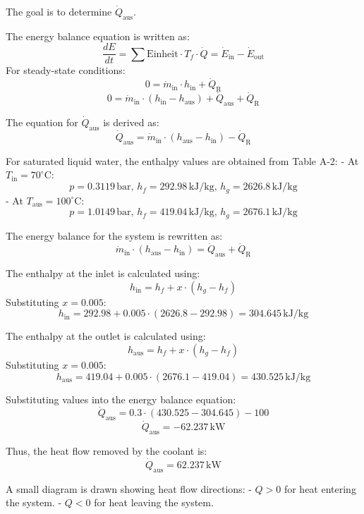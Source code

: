 The goal is to determine \( \dot{Q}_{\text{aus}} \).  

The energy balance equation is written as:  
\[
\frac{dE}{dt} = \sum \text{Einheit} \cdot T_f \cdot \dot{Q} = \dot{E}_{\text{in}} - \dot{E}_{\text{out}}
\]  
For steady-state conditions:  
\[
0 = \dot{m}_{\text{in}} \cdot h_{\text{in}} + \dot{Q}_{\text{R}}
\]  
\[
0 = \dot{m}_{\text{in}} \cdot (h_{\text{in}} - h_{\text{aus}}) + \dot{Q}_{\text{aus}} + \dot{Q}_{\text{R}}
\]  

The equation for \( \dot{Q}_{\text{aus}} \) is derived as:  
\[
\dot{Q}_{\text{aus}} = \dot{m}_{\text{in}} \cdot (h_{\text{aus}} - h_{\text{in}}) - \dot{Q}_{\text{R}}
\]  

For saturated liquid water, the enthalpy values are obtained from Table A-2:  
- At \( T_{\text{in}} = 70^\circ\text{C} \):  
  \[
  p = 0.3119 \, \text{bar}, \, h_f = 292.98 \, \text{kJ/kg}, \, h_g = 2626.8 \, \text{kJ/kg}
  \]  
- At \( T_{\text{aus}} = 100^\circ\text{C} \):  
  \[
  p = 1.0149 \, \text{bar}, \, h_f = 419.04 \, \text{kJ/kg}, \, h_g = 2676.1 \, \text{kJ/kg}
  \]  

The energy balance for the system is rewritten as:  
\[
\dot{m}_{\text{in}} \cdot (h_{\text{aus}} - h_{\text{in}}) = \dot{Q}_{\text{aus}} + \dot{Q}_{\text{R}}
\]  

The enthalpy at the inlet is calculated using:  
\[
h_{\text{in}} = h_f + x \cdot (h_g - h_f)
\]  
Substituting \( x = 0.005 \):  
\[
h_{\text{in}} = 292.98 + 0.005 \cdot (2626.8 - 292.98) = 304.645 \, \text{kJ/kg}
\]  

The enthalpy at the outlet is calculated using:  
\[
h_{\text{aus}} = h_f + x \cdot (h_g - h_f)
\]  
Substituting \( x = 0.005 \):  
\[
h_{\text{aus}} = 419.04 + 0.005 \cdot (2676.1 - 419.04) = 430.525 \, \text{kJ/kg}
\]  

Substituting values into the energy balance equation:  
\[
\dot{Q}_{\text{aus}} = 0.3 \cdot (430.525 - 304.645) - 100
\]  
\[
\dot{Q}_{\text{aus}} = -62.237 \, \text{kW}
\]  

Thus, the heat flow removed by the coolant is:  
\[
\dot{Q}_{\text{aus}} = 62.237 \, \text{kW}
\]  

A small diagram is drawn showing heat flow directions:  
- \( Q > 0 \) for heat entering the system.  
- \( Q < 0 \) for heat leaving the system.